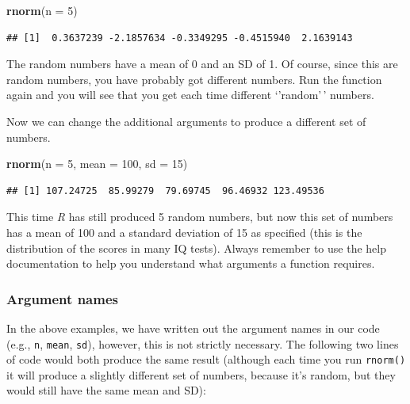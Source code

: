 \documentclass[
]{scrartcl}
\newenvironment{Shaded}{\begin{snugshade}}{\end{snugshade}}
\newcommand{\AttributeTok}[1]{\textcolor[rgb]{0.13,0.29,0.53}{#1}}
\newcommand{\DecValTok}[1]{\textcolor[rgb]{0.00,0.00,0.81}{#1}}
\newcommand{\FunctionTok}[1]{\textcolor[rgb]{0.13,0.29,0.53}{\textbf{#1}}}
\newcommand{\NormalTok}[1]{#1}
\begin{document}
\begin{Shaded}
\begin{Highlighting}[]
\FunctionTok{rnorm}\NormalTok{(}\AttributeTok{n =} \DecValTok{5}\NormalTok{)}
\end{Highlighting}
\end{Shaded}

\begin{verbatim}
## [1]  0.3637239 -2.1857634 -0.3349295 -0.4515940  2.1639143
\end{verbatim}

The random numbers have a mean of 0 and an SD of 1. Of course, since this are random numbers, you have probably got different numbers. Run the function again and you will see that you get each time different `'random'\,' numbers.

Now we can change the additional arguments to produce a different set of numbers.

\begin{Shaded}
\begin{Highlighting}[]
\FunctionTok{rnorm}\NormalTok{(}\AttributeTok{n =} \DecValTok{5}\NormalTok{, }\AttributeTok{mean =} \DecValTok{100}\NormalTok{, }\AttributeTok{sd =} \DecValTok{15}\NormalTok{)}
\end{Highlighting}
\end{Shaded}

\begin{verbatim}
## [1] 107.24725  85.99279  79.69745  96.46932 123.49536
\end{verbatim}

This time \emph{R} has still produced 5 random numbers, but now this set of numbers has a mean of 100 and a standard deviation of 15 as specified (this is the distribution of the scores in many IQ tests). Always remember to use the help documentation to help you understand what arguments a function requires.

\subsubsection{Argument names}\label{argument-names}

In the above examples, we have written out the argument names in our code (e.g., \texttt{n}, \texttt{mean}, \texttt{sd}), however, this is not strictly necessary. The following two lines of code would both produce the same result (although each time you run \texttt{rnorm()} it will produce a slightly different set of numbers, because it's random, but they would still have the same mean and SD):
\end{document}
